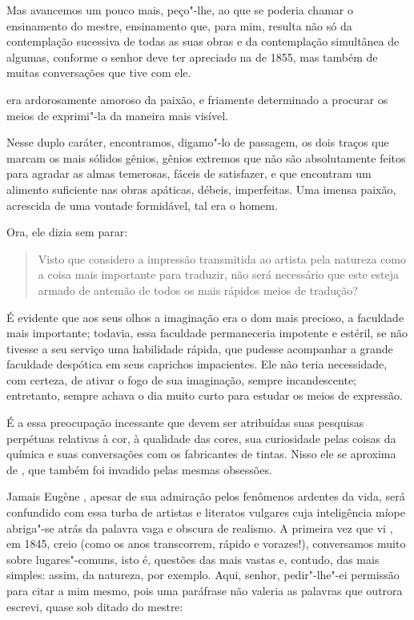 Mas avancemos um pouco mais, peço"-lhe, ao que se poderia chamar o
ensinamento do mestre, ensinamento que, para mim, resulta não só da
contemplação sucessiva de todas as suas obras e da contemplação
simultânea de algumas, conforme o senhor deve ter apreciado na
 de 1855, mas também de muitas conversações que tive
com ele.

\sectionitem

 era ardorosamente amoroso da paixão, e friamente determinado a
procurar os meios de exprimi"-la da maneira mais visível.

Nesse duplo caráter, encontramos, digamo"-lo de passagem, os dois traços
que marcam os mais sólidos gênios, gênios extremos que não são
absolutamente feitos para agradar as almas temerosas, fáceis de
satisfazer, e que encontram um alimento suficiente nas obras apáticas,
débeis, imperfeitas. Uma imensa paixão, acrescida de uma vontade
formidável, tal era o homem.

Ora, ele dizia sem parar:

\begin{quote}
Visto que considero a impressão transmitida ao artista pela natureza
como a coisa mais importante para traduzir, não será necessário que
este esteja armado de antemão de todos os mais rápidos meios de
tradução?
\end{quote}

É evidente que aos seus olhos a imaginação era o dom mais precioso, a
faculdade mais importante; todavia, essa faculdade permaneceria
impotente e estéril, se não tivesse a seu serviço uma habilidade
rápida, que pudesse acompanhar a grande faculdade despótica em seus
caprichos impacientes. Ele não teria necessidade, com certeza, de
ativar o fogo de sua imaginação, sempre incandescente; entretanto,
sempre achava o dia muito curto para estudar os meios de expressão.

É a essa preocupação incessante que devem ser atribuídas suas pesquisas
perpétuas relativas à cor, à qualidade das cores, sua curiosidade pelas
coisas da química e suas conversações com os fabricantes de tintas.
Nisso ele se aproxima de , que também foi invadido
pelas mesmas obsessões.

Jamais Eugène , apesar de sua admiração pelos fenômenos
ardentes da vida, será confundido com essa turba de artistas e
literatos vulgares cuja inteligência míope abriga"-se atrás da palavra
vaga e obscura de realismo. A primeira vez que vi , em 1845,
creio (como os anos transcorrem, rápido e vorazes!), conversamos muito
sobre lugares"-comuns, isto é, questões das mais vastas e, contudo, das
mais simples: assim, da natureza, por exemplo. Aqui, senhor,
pedir"-lhe"-ei permissão para citar a mim mesmo, pois uma paráfrase não
valeria as palavras que outrora escrevi, quase sob ditado do mestre:


